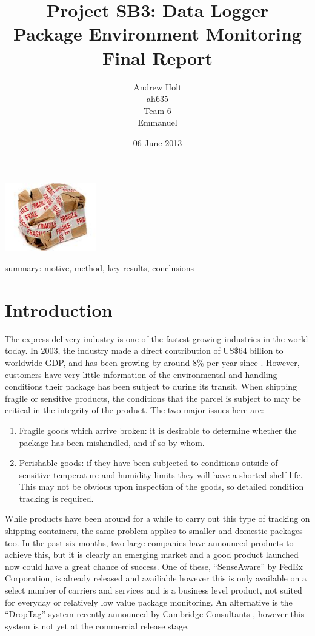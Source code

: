\documentclass[a4paper,10pt]{article}  %
\title{Project SB3: Data Logger\\
       Package Environment Monitoring\\
       Final Report}
\author{Andrew Holt\\
        ah635\\
        Team 6\\
        Emmanuel}
\date{06 June 2013}
\begin{document}
\listoftodos

\maketitle

\begin{center}
  \includegraphics[width=0.3\textwidth]{damaged_parcel.jpg}
\end{center}

\noindent summary: motive, method, key results, conclusions 

\tableofcontents

\section{Introduction}
\label{sec:introduction}

The express delivery industry is one of the fastest growing industries
in the world today. In 2003, the industry made a direct contribution
of US\$64 billion to worldwide GDP, and has been growing by around 8\%
per year since \cite{OEF2005}. However, customers have very little
information of the environmental and handling conditions their package
has been subject to during its transit. When shipping fragile or
sensitive products, the conditions that the parcel is subject to may
be critical in the integrity of the product. The two major issues here
are:
\begin{enumerate}
\item Fragile goods which arrive broken: it is desirable to determine
  whether the package has been mishandled, and if so by whom.
\item Perishable goods: if they have been subjected to conditions
  outside of sensitive temperature and humidity limits they will have
  a shorted shelf life. This may not be obvious upon inspection of the
  goods, so detailed condition tracking is required.
\end{enumerate}
While products have been around for a while to carry out this type of
tracking on shipping containers, the same problem applies to smaller
and domestic packages too. In the past six months, two large companies
have announced products to achieve this, but it is clearly an emerging
market and a good product launched now could have a great chance of
success. One of these, ``SenseAware''\cite{SA_PR} by FedEx
Corporation, is already released and availiable however this is only
available on a select number of carriers and services and is a
business level product, not suited for everyday or relatively low
value package monitoring. An alternative is the ``DropTag'' system
recently announced by Cambridge Consultants \cite{DT_PR}, however this
system is not yet at the commercial release stage.
\end{document}
